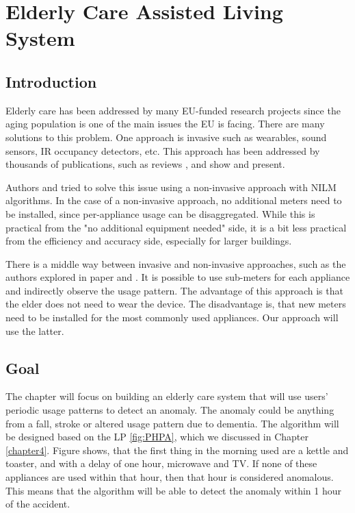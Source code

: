 \chapter{Elderly Care Assisted Living System} %

\label{chapter6} %


\section{Introduction}


Elderly care has been addressed by many EU-funded research projects since the aging population is one of the main issues the EU is facing. 
There are many solutions to this problem.
One approach is invasive such as wearables, sound sensors, IR occupancy detectors, etc. 
This approach has been addressed by thousands of publications, such as reviews \cite{elderReview1}, \cite{elderReview2} and \cite{elderReview3} show and present.

Authors \cite{elderNILM} and \cite{elderNILMDementia} tried to solve this issue using a non-invasive approach with NILM algorithms. 
In the case of a non-invasive approach, no additional meters need to be installed, since per-appliance usage can be disaggregated.
While this is practical from the "no additional equipment needed" side, it is a bit less practical from the efficiency and accuracy side, especially for larger buildings. 

There is a middle way between invasive and non-invasive approaches, such as the authors explored in paper \cite{elder1} and \cite{elder2}. 
It is possible to use sub-meters for each appliance and indirectly observe the usage pattern. 
The advantage of this approach is that the elder does not need to wear the device.
The disadvantage is, that new meters need to be installed for the most commonly used appliances.
Our approach will use the latter.

\section{Goal}

The chapter will focus on building an elderly care system that will use users' periodic usage patterns to detect an anomaly.
The anomaly could be anything from a fall, stroke or altered usage pattern due to dementia. 
The algorithm will be designed based on the LP \ref{fig:PHPA}, which we discussed in Chapter \ref{chapter4}.
Figure shows, that the first thing in the morning used are a kettle and toaster, and with a delay of one hour, microwave and TV. 
If none of these appliances are used within that hour, then that hour is considered anomalous.
This means that the algorithm will be able to detect the anomaly within 1 hour of the accident.

